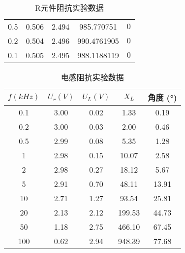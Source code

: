 \documentclass[dvipsnames, svgnames,a4paper,11pt]{article}
\begin{document}
\begin{enumerate}
\begin{table}[h]
\begin{tabular}{|c|c|c|c|c|}
			0.5   & 0.506 & 2.494 & 985.770751 & $0 $\\
			
			0.2   & 0.504 & 2.496 & 990.4761905 & $0 $\\
			
			0.1   & 0.505 & 2.495 &988.1188119 &$0 $ \\
		\hline
			
			\end{tabular}
			\caption{R元件阻抗实验数据}
			
			\end{table}
			\begin{table}[H]
				\centering
				\begin{tabular}{|c|c|c|c|c|}
					\hline
					$f (kHz)$ & $U_r (V)$ &$ U_L (V)$ & $X_L$& 角度 (°) \\
					\hline
					0.1  & 3.00 & 0.02 & 1.33 & 0.19 \\
					0.2  & 3.00 & 0.03 & 2.00 & 0.46 \\
					0.5  & 2.99 & 0.08 & 5.35 & 1.28 \\
					1    & 2.98 & 0.15 & 10.07 & 2.58 \\
					2    & 2.98 & 0.27 & 18.12 & 5.67 \\
					5    & 2.91 & 0.70 & 48.11 & 13.91 \\
					10   & 2.71 & 1.27 & 93.54 & 25.81 \\
					20   & 2.13 & 2.12 & 199.53 & 44.73 \\
					50   & 1.18 & 2.75 & 466.10 & 67.45 \\
					100  & 0.62 & 2.94 & 948.39 & 77.68 \\
					\hline
				\end{tabular}
				\caption{电感阻抗实验数据}
			\end{table}


\end{enumerate}
\end{document}

